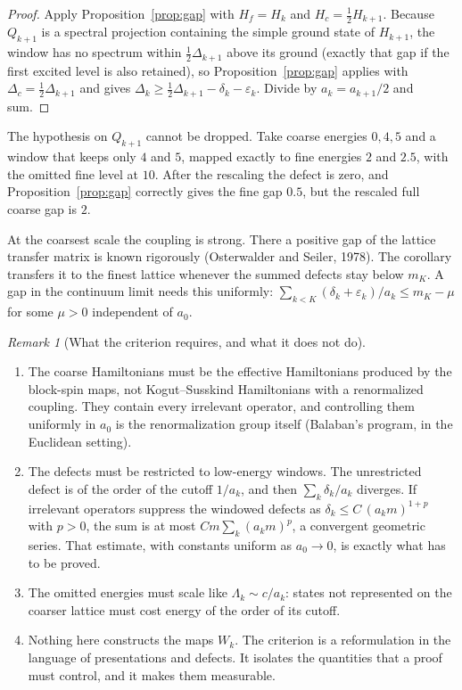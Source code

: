 \documentclass[11pt]{article}
\theoremstyle{remark}
\newtheorem{remark}[proposition]{Remark}
\begin{document}
\begin{proof}
Apply Proposition~\ref{prop:gap} with $H_f=H_k$ and $H_c=\tfrac12H_{k+1}$. Because $Q_{k+1}$ is a spectral projection containing the simple ground state of $H_{k+1}$, the window has no spectrum within $\tfrac12\Delta_{k+1}$ above its ground (exactly that gap if the first excited level is also retained), so Proposition~\ref{prop:gap} applies with $\Delta_c=\tfrac12\Delta_{k+1}$ and gives $\Delta_k\ge\tfrac12\Delta_{k+1}-\delta_k-\varepsilon_k$. Divide by $a_k=a_{k+1}/2$ and sum.
\end{proof}

The hypothesis on $Q_{k+1}$ cannot be dropped. Take coarse energies $0,4,5$ and a window that keeps only $4$ and $5$, mapped exactly to fine energies $2$ and $2.5$, with the omitted fine level at $10$. After the rescaling the defect is zero, and Proposition~\ref{prop:gap} correctly gives the fine gap $0.5$, but the rescaled full coarse gap is $2$.

At the coarsest scale the coupling is strong. There a positive gap of the lattice transfer matrix is known rigorously (Osterwalder and Seiler, 1978). The corollary transfers it to the finest lattice whenever the summed defects stay below $m_K$. A gap in the continuum limit needs this uniformly: $\sum_{k<K}(\delta_k+\varepsilon_k)/a_k\le m_K-\mu$ for some $\mu>0$ independent of $a_0$.

\begin{remark}[What the criterion requires, and what it does not do]
\begin{enumerate}
\item[(a)] The coarse Hamiltonians must be the effective Hamiltonians produced by the block-spin maps, not Kogut--Susskind Hamiltonians with a renormalized coupling. They contain every irrelevant operator, and controlling them uniformly in $a_0$ is the renormalization group itself (Balaban's program, in the Euclidean setting).
\item[(b)] The defects must be restricted to low-energy windows. The unrestricted defect is of the order of the cutoff $1/a_k$, and then $\sum_k\delta_k/a_k$ diverges. If irrelevant operators suppress the windowed defects as $\delta_k\le C\,(a_km)^{1+p}$ with $p>0$, the sum is at most $Cm\sum_k(a_km)^p$, a convergent geometric series. That estimate, with constants uniform as $a_0\to0$, is exactly what has to be proved.
\item[(c)] The omitted energies must scale like $\Lambda_k\sim c/a_k$: states not represented on the coarser lattice must cost energy of the order of its cutoff.
\item[(d)] Nothing here constructs the maps $W_k$. The criterion is a reformulation in the language of presentations and defects. It isolates the quantities that a proof must control, and it makes them measurable.
\end{enumerate}
\end{remark}
\end{document}
